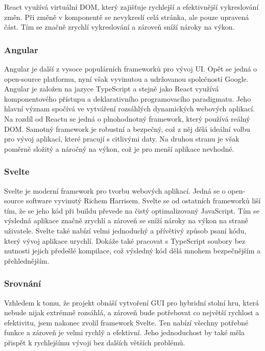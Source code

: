React využívá virtuální DOM, který zajišťuje rychlejší a efektivnější vykreslování změn. Při změně v komponentě se nevykreslí celá stránka, ale pouze upravená část. Tím se značně zrychlí vykreslování a zároveň sníží nároky na výkon.\cite{react, what_react_is_and_why_it_matters,angular_vs_react}

\subsubsection*{Angular}
Angular je další z vysoce populárních frameworků pro vývoj UI. Opět se jedná o open-source platformu, nyní však vyvinutou a udržovanou společností Google. Angular je založen na jazyce TypeScript a stejně jako React využívá komponentového přístupu a deklarativního programovacího paradigmatu. Jeho hlavní význam spočívá ve vytváření rozsáhlých dynamických webových aplikací. Na rozdíl od Reactu se jedná o plnohodnotný framework, který používá reálný DOM. Samotný framework je robustní a bezpečný, což z něj dělá ideální volbu pro vývoj aplikací, které pracují s citlivými daty. Na druhou stranu je však poměrně složitý a náročný na výkon, což je pro menší aplikace nevhodné.\cite{what_is_angular,angular_vs_react}

\subsubsection*{Svelte}
Svelte je moderní framework pro tvorbu webových aplikací. Jedná se o open-source software vyvinutý Richem Harrisem. Svelte se od ostatních frameworků liší tím, že se jeho kód při buildu převede na čistý optimalizovaný JavaScript. Tím se výsledná aplikace značně zrychlí a zároveň se sníží nároky na výkon na straně uživatele. Svelte také nabízí velmi jednoduchý a přívětivý způsob psaní kódu, který vývoj aplikace urychlí. Dokáže také pracovat s TypeScript soubory bez nutnosti jejich předešlé kompilace, což výsledný kód dělá mnohem bezpečnějším a přehlednějším.\cite{svelte_and_why_you_should_consider_it,svelte}

\subsubsection*{Srovnání}
Vzhledem k tomu, že projekt obnáší vytvoření GUI pro hybridní stolní hru, která nebude nijak extrémně rozsáhlá, a zároveň bude potřebovat co největší rychlost a efektivitu, jsem nakonec zvolil framework Svelte. Ten nabízí všechny potřebné funkce a zároveň je velmi rychlý a efektivní. Jeho jednoduchost by také měla přispět k rychlejšímu vývoji bez dalších větších problémů.

